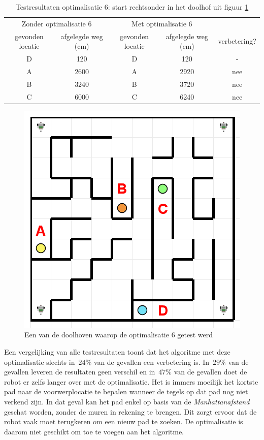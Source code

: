 \documentclass[eind]{penoverslag}
\begin{document}
\begin{table}[h]
\begin{center}
    \begin{tabular}{c | c | c | c | c}
   \multicolumn{2}{c|}{Zonder optimalisatie 6} & \multicolumn{2}{|c|}{Met optimalisatie 6} &\\
     gevonden locatie &  afgelegde weg (cm) & gevonden locatie &  afgelegde weg (cm)& verbetering?\\ \hline\hline
    D & 120 & D & 120 & -\\ \hline
    A & 2600 & A & 2920 & nee\\ \hline
    B & 3240 & B & 3720 & nee\\ \hline
    C & 6000 & C & 6240 & nee\\
    \end{tabular}
    \caption{Testresultaten optimalisatie 6: start rechtsonder in het doolhof uit figuur \ref{fig:TestDead}}
    \label{tab:resultVerken2}
\end{center}
\end{table}

\begin{figure}[!hb]
\centering
	\includegraphics[scale=0.5]{doolhof3}
	\caption{Een van de doolhoven waarop de optimalisatie 6 getest werd}
\label{fig:TestDead}
\end{figure}


Een vergelijking van alle testresultaten toont dat het algoritme met deze optimalisatie slechts in~$24\%$ van de gevallen een verbetering is. In~$29\%$ van de gevallen leveren de resultaten geen verschil en in~$47\%$ van de gevallen doet de robot er zelfs langer over met de optimalisatie. Het is immers moeilijk het kortste pad naar de voorwerplocatie te bepalen wanneer de tegels op dat pad nog niet verkend zijn. In dat geval kan het pad enkel op basis van de \textit{Manhattanafstand} geschat worden, zonder de muren in rekening te brengen. Dit zorgt ervoor dat de robot vaak moet terugkeren om een nieuw pad te zoeken. De optimalisatie is daarom niet geschikt om toe te voegen aan het algoritme. \\
\end{document}
